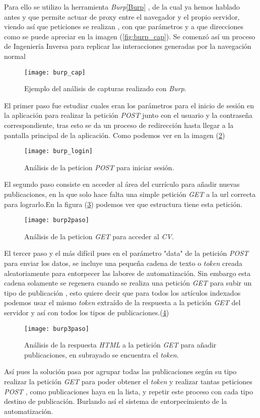 	Para ello se utilizo la herramienta \emph{Burp}\ref{Burp} , de la cual ya hemos hablado antes y que permite actuar de proxy entre el navegador y el propio servidor, viendo así que peticiones se realizan , con que parámetros y a que direcciones como se puede apreciar en la imagen (\ref{fig:burp_cap}). Se comenzó así un proceso de Ingeniería Inversa para replicar las interacciones generadas por la navegación normal 
\begin{figure}[H]
	\centering
	\texttt{[image: burp\_cap]}
	\caption{Ejemplo del análisis de capturas realizado con \emph{Burp}.}
	\label{fig:burp}
\end{figure}
	El primer paso fue estudiar cuales eran los parámetros para el inicio de sesión en la aplicación para realizar la petición \emph{POST} junto con el usuario y la contraseña correspondiente, tras esto se da un proceso de redirección hasta llegar a la pantalla principal de la aplicación. Como podemos ver en la imagen (\ref{fig:burp_login})
\begin{figure}[H]
	\centering
	\texttt{[image: burp\_login]}
	\caption{Análisis de la peticion \emph{POST} para iniciar sesión.}
	\label{fig:burp_login}
\end{figure}
	El segundo paso consiste en acceder al área del currículo para añadir nuevas publicaciones, en la que solo hace falta una simple petición \emph{GET} a la url correcta para lograrlo.En la figura (\ref{fig:burp2paso}) podemos ver que estructura tiene esta petición.
\begin{figure}[H]
	\centering
	\texttt{[image: burp2paso]}
	\caption{Análisis de la peticion \emph{GET} para acceder al \emph{CV}.}
	\label{fig:burp2paso}
\end{figure}
	El tercer paso y el más difícil pues en el parámetro "data" de la petición \emph{POST} para enviar los datos, se incluye una pequeña cadena de texto o \emph{token} creada aleatoriamente para entorpecer las labores de automatización. Sin embargo esta cadena solamente se regenera cuando se realiza una petición \emph{GET} para subir un tipo de publicación , esto quiere decir que para todos los artículos indexados podemos usar el mismo \emph{token} extraído de la respuesta a la petición \emph{GET} del servidor y así con todos los tipos de publicaciones.(\ref{fig:burp3paso})
\begin{figure}[H]
	\centering
	\texttt{[image: burp3paso]}
	\caption{Análisis de la respuesta \emph{HTML} a la petición \emph{GET} para añadir publicaciones, en subrayado se encuentra el \emph{token}.}
	\label{fig:burp3paso}
\end{figure}
	Así pues la solución pasa por agrupar todas las publicaciones según su tipo realizar la petición \emph{GET} para poder obtener el \emph{token} y realizar tantas peticiones \emph{POST} , como publicaciones haya en la lista, y repetir este proceso con cada tipo destino de publicación. Burlando así el sistema de entorpecimiento de la automatización.
